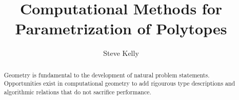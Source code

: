\documentclass[a4paper]{report}
\title{Computational Methods for Parametrization of Polytopes}
\author{Steve Kelly}
\begin{document}
\maketitle

\tableofcontents
\clearpage 


\begin{abstract}
Geometry is fundamental to the development of natural problem statements.
Opportunities exist in computational geometry to
add rigourous type descriptions and algorithmic relations that do not
sacrifice performance.
\end{abstract}
















\end{document}
